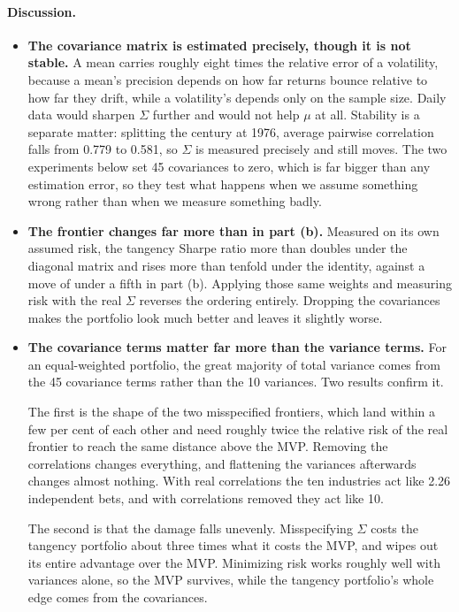 \documentclass[11pt]{article}
\begin{document}
\paragraph{Discussion.}
\begin{itemize}
\setlength{\itemsep}{6pt}\setlength{\parskip}{0pt}

\item \textbf{The covariance matrix is estimated precisely, though it is not
stable.} A mean carries roughly eight times the relative error of a
volatility, because a mean's precision depends on how far returns bounce
relative to how far they drift, while a volatility's depends only on the
sample size. Daily data would sharpen $\Sigma$ further and would not help
$\mu$ at all. Stability is a separate matter: splitting the century at 1976,
average pairwise correlation falls from 0.779 to 0.581, so $\Sigma$ is
measured precisely and still moves. The two experiments below set 45
covariances to zero, which is far bigger than any estimation error, so they
test what happens when we assume something wrong rather than when we measure
something badly.

\item \textbf{The frontier changes far more than in part (b).} Measured on its
own assumed risk, the tangency Sharpe ratio more than doubles under the
diagonal matrix and rises more than tenfold under the identity, against a move
of under a fifth in part (b). Applying those same weights and measuring risk
with the real $\Sigma$ reverses the ordering entirely. Dropping the
covariances makes the portfolio look much better and leaves it slightly worse.

\item \textbf{The covariance terms matter far more than the variance terms.}
For an equal-weighted portfolio, the great majority of total variance comes
from the 45 covariance terms rather than the 10 variances. Two results confirm
it.

The first is the shape of the two misspecified frontiers, which land within a
few per cent of each other and need roughly twice the relative risk of the
real frontier to reach the same distance above the MVP. Removing the
correlations changes everything, and flattening the variances afterwards
changes almost nothing. With real correlations the ten industries act like
2.26 independent bets, and with correlations removed they act like 10.

The second is that the damage falls unevenly. Misspecifying $\Sigma$ costs the
tangency portfolio about three times what it costs the MVP, and wipes out its
entire advantage over the MVP. Minimizing risk works roughly well with
variances alone, so the MVP survives, while the tangency portfolio's whole
edge comes from the covariances.

\end{itemize}
\end{document}
